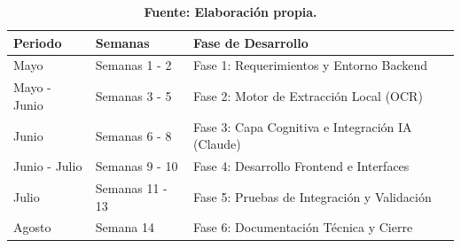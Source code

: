 \begin{table}[H]
    \centering
    \caption{Cronograma condensado de implementación de SAGAI.}
    \label{tab:cronograma_sagai}
    \begin{tabular}{|l|l|l|}
        \hline
        \textbf{Periodo} & \textbf{Semanas} & \textbf{Fase de Desarrollo} \\
        \hline
        Mayo & Semanas 1 - 2 & Fase 1: Requerimientos y Entorno Backend \\
        \hline
        Mayo - Junio & Semanas 3 - 5 & Fase 2: Motor de Extracción Local (OCR) \\
        \hline
        Junio & Semanas 6 - 8 & Fase 3: Capa Cognitiva e Integración IA (Claude) \\
        \hline
        Junio - Julio & Semanas 9 - 10 & Fase 4: Desarrollo Frontend e Interfaces \\
        \hline
        Julio & Semanas 11 - 13 & Fase 5: Pruebas de Integración y Validación \\
        \hline
        Agosto & Semana 14 & Fase 6: Documentación Técnica y Cierre \\
        \hline
    \end{tabular}
    \caption*{\footnotesize \textbf{Fuente: Elaboración propia.}}
\end{table}